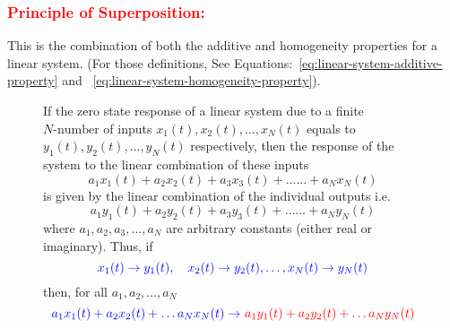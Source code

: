 \documentclass[../notes-main.tex]{subfiles}
\begin{document}
\subsubsection{\textcolor{red}{Principle of Superposition:}}
This is the combination of both the additive and homogeneity properties for a linear system. (For those definitions, See Equations:~\ref{eq:linear-system-additive-property} and ~\ref{eq:linear-system-homogeneity-property}).
\begin{figure}[H]
    \centering
    \begin{mdframed}
        \begin{center}
            If the zero state response of a linear system due to a finite \(N\text{-number}\) of inputs \(x_1(t), x_2(t), \dots, x_N(t)\) equals to \(y_1(t), y_2(t), \dots, y_N(t)\) respectively, then the response of the system to the linear combination of these inputs
            \begin{equation}
                a_1x_1(t) + a_2x_2(t) + a_3x_3(t) + \dots\dots + a_Nx_N(t)
                \label{eq:linear-system-superposition-input}
            \end{equation}
            \noindent is given by the linear combination of the individual outputs i.e.
            \begin{equation}
                a_1y_1(t) + a_2y_2(t) + a_3y_3(t) + \dots\dots + a_Ny_N(t)
                \label{eq:linear-system-superposition-output}
            \end{equation}
            \noindent where \(a_1, a_2, a_3, \dots, a_N\) are arbitrary constants (either real or imaginary).   
            Thus, if 
            \begin{equation}
                \textcolor{blue}{x_1(t) \rightarrow y_1(t), \quad x_2(t) \rightarrow y_2(t), \dots, x_N(t) \rightarrow y_N(t)}
                \label{eq:linear-system-superposition-def-eq-1}
            \end{equation}
            then, for all \(a_1, a_2, \dots, a_N\)
            \begin{equation}
                \textcolor{blue}{a_1x_1(t) + a_2x_2(t) + \ldots  a_Nx_N(t)\rightarrow}\ \textcolor{red}{ a_1y_1(t) + a_2y_2(t) + \ldots  a_Ny_N(t)}
                \label{eq:linear-system-superposition-def-eq-2}
            \end{equation}          
        \end{center}
    \end{mdframed}\label{fig:linear-system-superposition-def-1}
    \vspace{-1em}
\end{figure}
\end{document}

